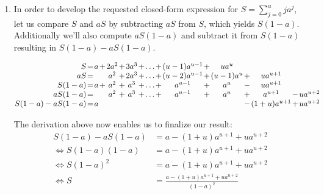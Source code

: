 \documentclass[12pt]{article}
\begin{document}
\begin{enumerate}
\begin{enumerate}
\item
In order to develop the requested closed-form expression for $S = \sum_{j=0}^{u}j a^{j}$, let us compare $S$ and $aS$ by subtracting $aS$ from $S$, which yields $S(1-a)$. Additionally we'll also compute $aS(1-a)$ and subtract it from $S(1-a)$ resulting in $S(1-a)-aS(1-a)$.

\[
\arraycolsep=0.6pt\def\arraystretch{1}
\begin{array}{@{}r c c c c c c c c c c c c c c c c c c c}
S & = & a & + & 2a^2 & + & 3a^3 & + & \ldots & + & (u-1)a^{u-1} & + & ua^u && \\
aS & = & & &  a^2 & + & 2a^3 & + & \ldots & + & (u-2)a^{u-1} & + & (u-1)a^{u} & + & ua^{u+1} && \\
S(1-a) & = & a & + &  a^2 & + & a^3 & + & \ldots & + & a^{u-1} & + & a^{u} & - & ua^{u+1} && \\
aS(1-a) & = & & &  a^2 & + & a^3 & + & \ldots & + & a^{u-1} & + & a^{u} & + & a^{u+1} & - & ua^{u+2} \\
S(1-a) - aS(1-a) & = & a &  &  &  &  & & & & & & & - & (1+u)a^{u+1} & + & ua^{u+2} \\
\end{array}
\]

The derivation above now enables us to finalize our result:
\begin{align*}
S(1-a) - aS(1-a) &= a - (1+u)a^{u+1} + ua^{u+2} \\
\iff S(1-a)(1-a) &= a - (1+u)a^{u+1} + ua^{u+2} \\
\iff S(1-a)^2 &= a - (1+u)a^{u+1} + ua^{u+2} \\
\iff S &= \frac{a - (1+u)a^{u+1} + ua^{u+2}}{(1-a)^2}
\end{align*}


\end{enumerate}
\end{enumerate}
\end{document}
